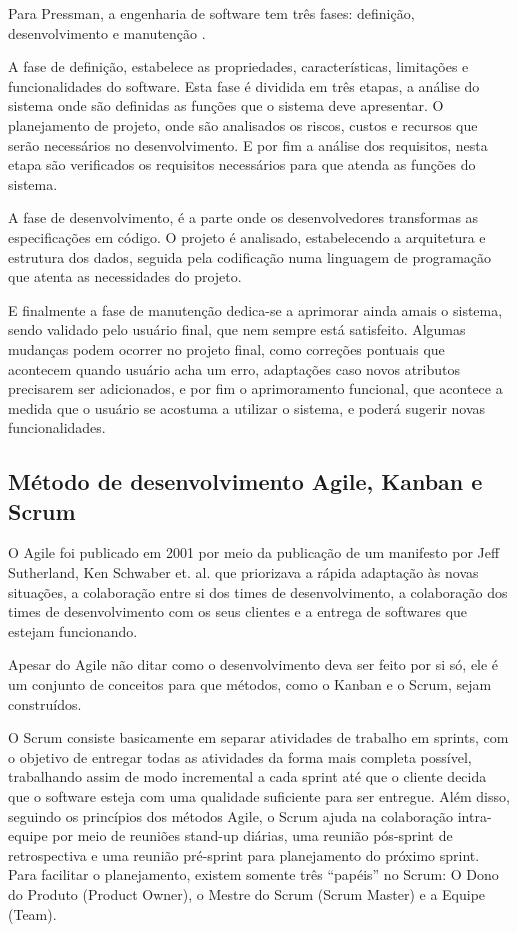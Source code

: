 \documentclass[
	article,			%
	11pt,				%
	oneside,			%
	a4paper,			%
	english,			%
	brazil,				%
	sumario=tradicional
	]{abntex2}
\begin{document}
Para Pressman, a engenharia de software tem três fases: definição,
desenvolvimento e manutenção \cite{pressman}.

A fase de definição, estabelece as propriedades, características, limitações e
funcionalidades do software. Esta fase é dividida em três etapas, a análise do
sistema onde são definidas as funções que o sistema deve apresentar.
O planejamento de projeto, onde  são analisados os riscos, custos e recursos que
serão necessários no desenvolvimento. E por fim a análise dos requisitos,
nesta etapa são verificados os requisitos necessários para que atenda as
funções do sistema.

A fase de desenvolvimento, é a parte onde os desenvolvedores transformas as
especificações em código. O projeto é analisado, estabelecendo a arquitetura e
estrutura dos dados, seguida pela codificação numa linguagem de programação
que atenta as necessidades do projeto.

E finalmente a fase de manutenção dedica-se a aprimorar ainda amais o sistema,
sendo validado pelo usuário final, que nem sempre está satisfeito. Algumas
mudanças podem ocorrer no projeto final, como correções pontuais que acontecem
quando usuário acha um erro, adaptações caso novos atributos precisarem ser
adicionados, e por fim o aprimoramento funcional, que acontece a medida que o
usuário se acostuma a utilizar o sistema, e poderá sugerir novas funcionalidades.

\subsection{Método de desenvolvimento Agile, Kanban e Scrum}

O Agile foi publicado em 2001 por meio da publicação de um manifesto por Jeff
Sutherland, Ken Schwaber et. al. que priorizava a rápida adaptação às novas
situações, a colaboração entre si dos times de desenvolvimento, a colaboração dos
times de desenvolvimento com os seus clientes e a entrega de softwares que estejam
funcionando. \cite{agilemanifesto}

Apesar do Agile não ditar como o desenvolvimento deva ser feito por si só, ele
é um conjunto de conceitos para que métodos, como o Kanban e o Scrum, sejam
construídos.

O Scrum consiste basicamente em separar atividades de trabalho em sprints, com
o objetivo de entregar todas as atividades da forma mais completa possível,
trabalhando assim de modo incremental a cada sprint até que o cliente decida que
o software esteja com uma qualidade suficiente para ser entregue. Além disso,
seguindo os princípios dos métodos Agile, o Scrum ajuda na colaboração intra-equipe
por meio de reuniões stand-up diárias, uma reunião pós-sprint de retrospectiva
e uma reunião pré-sprint para planejamento do próximo sprint. Para facilitar o
planejamento, existem somente três “papéis” no Scrum: O Dono do Produto (Product
Owner), o Mestre do Scrum (Scrum Master) e a Equipe (Team).
\end{document}
